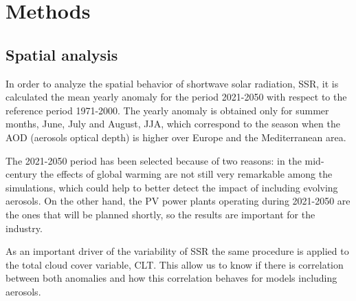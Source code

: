 {\section{Methods}\label{Methods}}

\subsection{Spatial analysis}

In order to analyze the spatial behavior of shortwave solar radiation, SSR, it is calculated the mean yearly anomaly for the period 2021-2050 with respect to the reference period 1971-2000. The yearly anomaly is obtained only for summer months, June, July and August, JJA, which correspond to the season when the AOD (aerosols optical depth) is higher over Europe and the Mediterranean area.

The 2021-2050 period has been selected because of two reasons: in the mid-century the effects of global warming are not still very remarkable among the simulations, which could help to better detect the impact of including evolving aerosols. On the other hand, the PV power plants operating during 2021-2050 are the ones that will be planned shortly, so the results are important for the industry.

As an important driver of the variability of SSR the same procedure is applied to the total cloud cover variable, CLT. This allow us to know if there is correlation between both anomalies and how this correlation behaves for models including aerosols.





